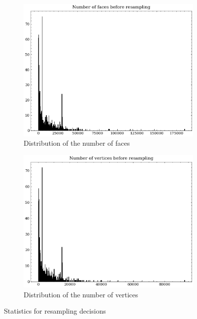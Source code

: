 \begin{figure}
    \centering
    \begin{subfigure}[b]{0.45\textwidth}
         \centering
         \includegraphics[width=\textwidth]{assets/preprocessing/Number_of_faces_before_resampling.png}
         \caption{Distribution of the number of faces}
         \label{fig:statistics-faces-vertices-number-a}
     \end{subfigure}
     \hfill
     \begin{subfigure}[b]{0.45\textwidth}
         \centering
         \includegraphics[width=\textwidth]{assets/preprocessing/Number_of_vertices_before_resampling.png}
         \caption{Distribution of the number of vertices}
         \label{fig:statistics-faces-vertices-number-b}
     \end{subfigure}
    \caption{Statistics for resampling decisions}
    \label{fig:statistics-faces-vertices-number}
\end{figure}

